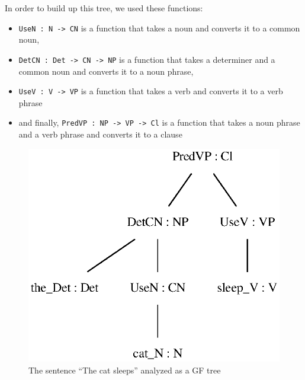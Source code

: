 In order to build up this tree, we used these functions:
\begin{itemize}
    \item  \verb|UseN : N -> CN| is a function that takes a noun and converts it to a common noun, 
    \item \verb|DetCN : Det -> CN -> NP| is a function that takes a determiner and a common noun and converts it to a noun phrase, 
    \item \verb|UseV : V -> VP| is a function that takes a verb and converts it to a verb phrase
    \item and finally, \verb|PredVP : NP -> VP -> Cl| is a function that takes a noun phrase and a verb phrase and converts it to a clause 
\end{itemize}

\begin{figure}[htb]
  \centering
  \includegraphics[width=0.5\linewidth]{thesis/figure/cat_sleeps_cl.eps}
  \caption{The sentence ``The cat sleeps'' analyzed as a GF tree}
  \label{fig:cat_sleeps_gf}
\end{figure}


%


